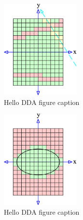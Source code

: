 	\begin{figure}
	  \centering
	  \includegraphics[width=4cm]{Space_Carving_3.png}
	  \caption{Hello DDA figure caption}\label{fig:SC-three-figsB}
	\end{figure}
	\begin{figure}
	  \centering
	  \includegraphics[width=4cm]{Space_Carving_4.png}
	  \caption{Hello DDA figure caption}\label{fig:SC-four-figsB}
	\end{figure}
\endinput 